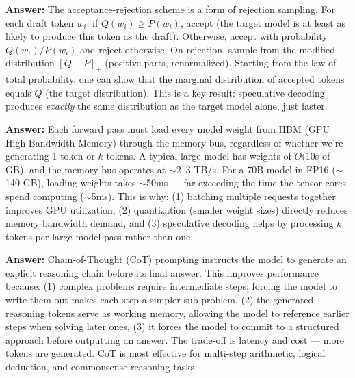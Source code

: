 \documentclass[11pt, a4paper]{article}
\begin{document}
\begin{notebox}
\textbf{Answer:} The acceptance-rejection scheme is a form of rejection sampling. For each draft token $w_i$: if $Q(w_i) \geq P(w_i)$, accept (the target model is at least as likely to produce this token as the draft). Otherwise, accept with probability $Q(w_i)/P(w_i)$ and reject otherwise. On rejection, sample from the modified distribution $[Q - P]_+$ (positive parts, renormalized). Starting from the law of total probability, one can show that the marginal distribution of accepted tokens equals $Q$ (the target distribution). This is a key result: speculative decoding produces \emph{exactly} the same distribution as the target model alone, just faster.
\end{notebox}

\begin{notebox}
\textbf{Answer:} Each forward pass must load every model weight from HBM (GPU High-Bandwidth Memory) through the memory bus, regardless of whether we're generating 1 token or $k$ tokens. A typical large model has weights of $O(10$s of GB), and the memory bus operates at $\sim$2--3 TB/s. For a 70B model in FP16 ($\sim$140 GB), loading weights takes $\sim$50ms --- far exceeding the time the tensor cores spend computing ($\sim$5ms). This is why: (1) batching multiple requests together improves GPU utilization, (2) quantization (smaller weight sizes) directly reduces memory bandwidth demand, and (3) speculative decoding helps by processing $k$ tokens per large-model pass rather than one.
\end{notebox}

\begin{notebox}
\textbf{Answer:} Chain-of-Thought (CoT) prompting instructs the model to generate an explicit reasoning chain before its final answer. This improves performance because: (1) complex problems require intermediate steps; forcing the model to write them out makes each step a simpler sub-problem, (2) the generated reasoning tokens serve as working memory, allowing the model to reference earlier steps when solving later ones, (3) it forces the model to commit to a structured approach before outputting an answer. The trade-off is latency and cost --- more tokens are generated. CoT is most effective for multi-step arithmetic, logical deduction, and commonsense reasoning tasks.
\end{notebox}
\end{document}
